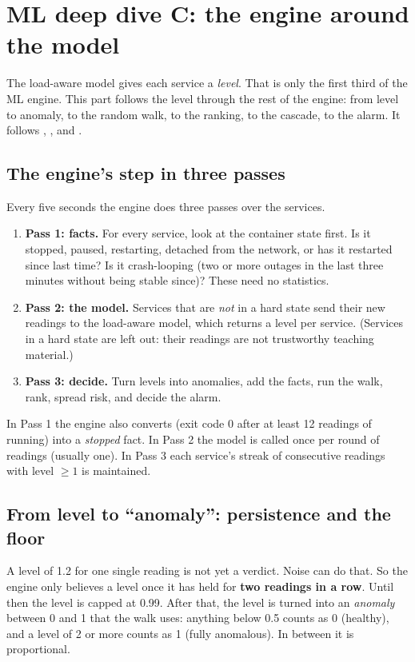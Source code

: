 \chapter{ML deep dive C: the engine around the model}
\label{ch:deepengine}

The load-aware model gives each service a \emph{level}. That is only the first third of the ML engine. This part follows the level through the rest of the engine: from level to anomaly, to the random walk, to the ranking, to the cascade, to the alarm. It follows , ,  and .

\section{The engine's step in three passes}
\begin{simplebox}
Every five seconds the engine does three passes over the services.

\begin{enumerate}
\item \textbf{Pass 1: facts.} For every service, look at the container state first. Is it stopped, paused, restarting, detached from the network, or has it restarted since last time? Is it crash-looping (two or more outages in the last three minutes without being stable since)? These need no statistics.
\item \textbf{Pass 2: the model.} Services that are \emph{not} in a hard state send their new readings to the load-aware model, which returns a level per service. (Services in a hard state are left out: their readings are not trustworthy teaching material.)
\item \textbf{Pass 3: decide.} Turn levels into anomalies, add the facts, run the walk, rank, spread risk, and decide the alarm.
\end{enumerate}
\end{simplebox}

\begin{techbox}
In Pass 1 the engine also converts  (exit code 0 after at least 12 readings of running) into a \emph{stopped} fact. In Pass 2 the model is called once per round of readings (usually one). In Pass 3 each service's streak of consecutive readings with level $\ge1$ is maintained.
\end{techbox}

\section{From level to ``anomaly'': persistence and the floor}
\begin{simplebox}
A level of 1.2 for one single reading is not yet a verdict. Noise can do that. So the engine only believes a level once it has held for \textbf{two readings in a row}. Until then the level is capped at 0.99. After that, the level is turned into an \emph{anomaly} between 0 and 1 that the walk uses: anything below 0.5 counts as 0 (healthy), and a level of 2 or more counts as 1 (fully anomalous). In between it is proportional.
\end{simplebox}

